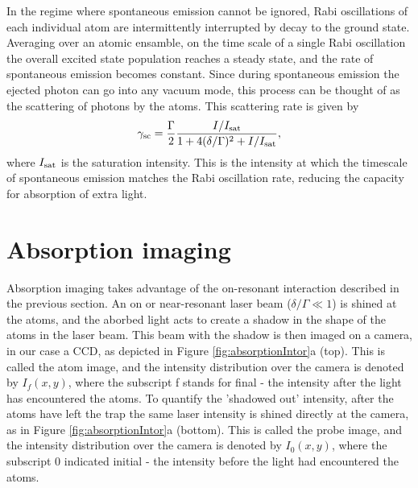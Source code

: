 In the regime where spontaneous emission cannot be ignored, Rabi oscillations of each individual atom are intermittently interrupted by decay to the ground state. Averaging over an atomic ensamble, on the time scale of a single Rabi oscillation the overall excited state population reaches a steady state, and the rate of spontaneous emission becomes constant. Since during spontaneous emission the ejected photon can go into any vacuum mode, this process can be thought of as the scattering of photons by the atoms. This scattering rate is given by\cite{LCT}
\begin{equation}
\gamma_{\rm{sc}}= \frac{\Gamma}{2} \frac{I/I_{\rm{sat}}}{1+4(\delta/\Gamma)^2 +I/I_{\rm{sat}}},
\label{eq:scatrate}
\end{equation}
where $I_{\rm{sat}}$ is the saturation intensity. This is the intensity at which the timescale of spontaneous emission matches the Rabi oscillation rate, reducing the capacity for absorption of extra light.   


\section{Absorption imaging}\label{sec:absorptionImaging}

Absorption imaging takes advantage of the on-resonant interaction described in the previous section. An on or near-resonant laser beam ($\delta/\Gamma\ll 1$) is shined at the atoms, and the aborbed light acts to create a shadow in the shape of the atoms in the laser beam. This beam with the shadow is then imaged on a camera, in our case a CCD, as depicted in Figure \ref{fig:absorptionIntor}a (top). This is called the atom image, and the intensity distribution over the camera is denoted by $I_f(x,y)$, where the subscript f stands for final - the intensity after the light has encountered the atoms. To quantify the 'shadowed out' intensity, after the atoms have left the trap the same laser intensity is shined directly at the camera, as in Figure \ref{fig:absorptionIntor}a (bottom).   This is called the probe image, and the intensity distribution over the camera is denoted by $I_0(x,y)$, where the subscript 0 indicated initial - the intensity before the light had encountered the atoms.



